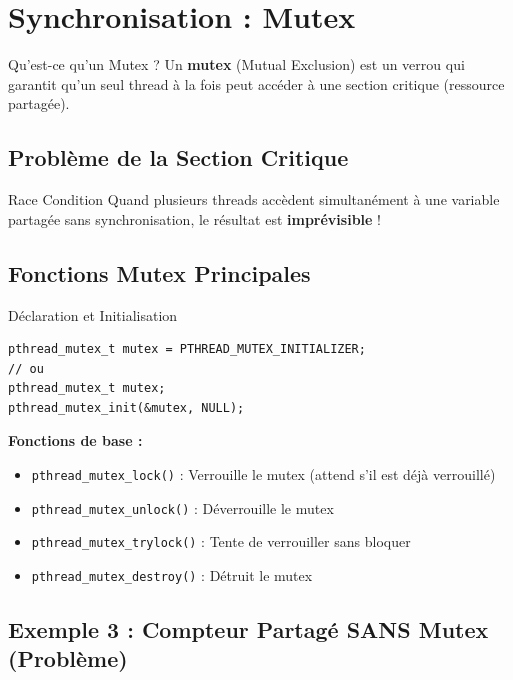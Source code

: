 \documentclass[11pt,a4paper]{article}
\begin{document}
\section{Synchronisation : Mutex}

\begin{definitionbox}{Qu'est-ce qu'un Mutex ?}
Un \textbf{mutex} (Mutual Exclusion) est un verrou qui garantit qu'un seul thread à la fois peut accéder à une section critique (ressource partagée).
\end{definitionbox}

\subsection{Problème de la Section Critique}

\begin{importantbox}{Race Condition}
Quand plusieurs threads accèdent simultanément à une variable partagée sans synchronisation, le résultat est \textbf{imprévisible} !
\end{importantbox}

\subsection{Fonctions Mutex Principales}

\begin{definitionbox}{Déclaration et Initialisation}
\begin{verbatim}
pthread_mutex_t mutex = PTHREAD_MUTEX_INITIALIZER;
// ou
pthread_mutex_t mutex;
pthread_mutex_init(&mutex, NULL);
\end{verbatim}
\end{definitionbox}

\textbf{Fonctions de base :}
\begin{itemize}
    \item \texttt{pthread\_mutex\_lock()} : Verrouille le mutex (attend s'il est déjà verrouillé)
    \item \texttt{pthread\_mutex\_unlock()} : Déverrouille le mutex
    \item \texttt{pthread\_mutex\_trylock()} : Tente de verrouiller sans bloquer
    \item \texttt{pthread\_mutex\_destroy()} : Détruit le mutex
\end{itemize}

\subsection{Exemple 3 : Compteur Partagé SANS Mutex (Problème)}
\end{document}
